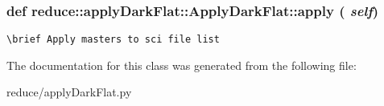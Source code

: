 \subsubsection{\setlength{\rightskip}{0pt plus 5cm}def reduce::apply\-Dark\-Flat::Apply\-Dark\-Flat::apply ( {\em self})}\label{classreduce_1_1applyDarkFlat_1_1ApplyDarkFlat_2ccbacd8bbabfebbe06bf5942ed8ed3c}




\footnotesize\begin{verbatim}
\brief Apply masters to sci file list
\end{verbatim}
\normalsize
 

The documentation for this class was generated from the following file:\begin{CompactItemize}
\item 
reduce/apply\-Dark\-Flat.py\end{CompactItemize}
